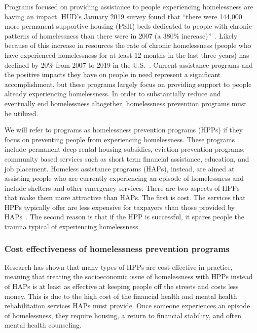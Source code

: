 \documentclass[10pt,letterpaper]{article}
\newcommand{\red}[1]{{\color{red}{#1}}}
\begin{document}
Programs focused on providing assistance to people experiencing homelessness are having an impact. HUD's January 2019 survey found that ``there were 144,000 more permanent supportive housing (PSH) beds dedicated to people with chronic patterns of homelessness than there were in 2007 (a 380\% increase)''~\cite{2019AHAR}. Likely because of this increase in resources the rate of chronic homelessness (people who have experienced homelessness for at least 12 months in the last three years) has declined by 20\% from 2007 to 2019 in the U.S.~\cite{2019AHAR}. Current assistance programs and the positive impacts they have on people in need represent a significant accomplishment, but these programs largely focus on providing support to people already experiencing homelessness. In order to substantially reduce and eventually end homelessness altogether, homelessness prevention programs must be utilized. 

We will refer to programs as homelessness prevention programs (HPPs) if they focus on preventing people from experiencing homelessness. These programs include permanent deep rental housing subsidies, eviction prevention programs, community based services such as short term financial assistance, education, and job placement. Homeless assistance programs (HAPs), instead, are aimed at assisting people who are currently experiencing an episode of homelessness and include shelters and other emergency services. There are two aspects of HPPs that make them more attractive than HAPs. The first is cost. The services that HPPs typically offer are less expensive for taxpayers than those provided by HAPs~\cite{shinn2019homelessness}. The second reason is that if the HPP is successful, it spares people the trauma typical of experiencing homelessness.

\subsubsection*{Cost effectiveness of homelessness prevention programs}
Research has shown that many types of HPPs are cost effective in practice, meaning that treating the socioeconomic issue of homelessness with HPPs instead of HAPs is at least as effective at keeping people off the streets and costs less money. This is due to the high cost of the financial health and mental health rehabilitation services HAPs must provide. Once someone experiences an episode of homelessness, they require housing, a return to financial stability, and often mental health counseling. \red{can I say this without citation?}
\end{document}
